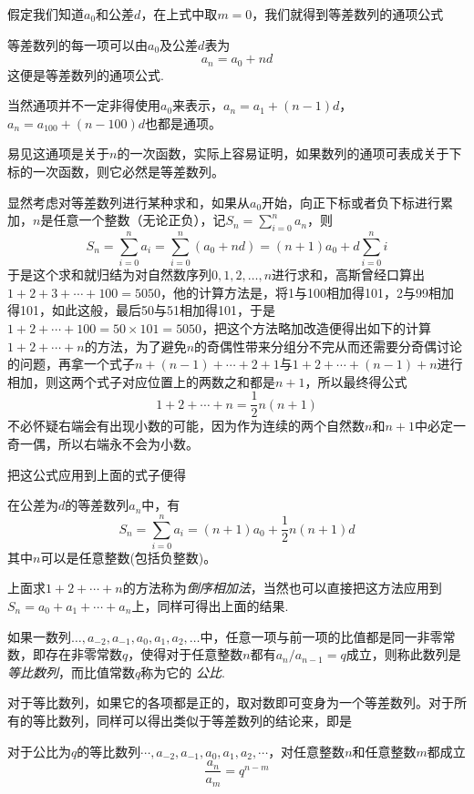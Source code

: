 假定我们知道$a_0$和公差$d$，在上式中取$m=0$，我们就得到等差数列的通项公式
\begin{theorem}
  等差数列的每一项可以由$a_0$及公差$d$表为
\[ a_n=a_0+nd \]
这便是等差数列的通项公式.
\end{theorem}

当然通项并不一定非得使用$a_0$来表示，$a_n=a_1+(n-1)d$，$a_n=a_{100}+(n-100)d$也都是通项。

易见这通项是关于$n$的一次函数，实际上容易证明，如果数列的通项可表成关于下标的一次函数，则它必然是等差数列。

显然考虑对等差数列进行某种求和，如果从$a_0$开始，向正下标或者负下标进行累加，$n$是任意一个整数（无论正负），记$S_n=\sum_{i=0}^{n}a_n$，则
\[ S_n=\sum_{i=0}^na_i=\sum_{i=0}^n(a_0+nd)=(n+1)a_0+d\sum_{i=0}^ni\]
于是这个求和就归结为对自然数序列$0,1,2,\ldots,n$进行求和，高斯曾经口算出$1+2+3+\cdots+100=5050$，他的计算方法是，将1与100相加得101，2与99相加得101，如此这般，最后50与51相加得101，于是$1+2+\cdots+100=50 \times 101=5050$，把这个方法略加改造便得出如下的计算$1+2+\cdots+n$的方法，为了避免$n$的奇偶性带来分组分不完从而还需要分奇偶讨论的问题，再拿一个式子$n+(n-1)+\cdots+2+1$与$1+2+\cdots+(n-1)+n$进行相加，则这两个式子对应位置上的两数之和都是$n+1$，所以最终得公式
\[ 1+2+\cdots+n = \frac{1}{2}n(n+1) \]
不必怀疑右端会有出现小数的可能，因为作为连续的两个自然数$n$和$n+1$中必定一奇一偶，所以右端永不会为小数。

把这公式应用到上面的式子便得
\begin{theorem}
  在公差为$d$的等差数列$a_n$中，有
  \[ S_n=\sum_{i=0}^na_i=(n+1)a_0+\frac{1}{2}n(n+1)d \]
  其中$n$可以是任意整数(包括负整数)。
\end{theorem}

上面求$1+2+\cdots+n$的方法称为\emph{倒序相加法}，当然也可以直接把这方法应用到$S_n=a_0+a_1+\cdots+a_n$上，同样可得出上面的结果.

\begin{definition}
  如果一数列$\ldots,a_{-2},a_{-1},a_0,a_1,a_2,\ldots$中，任意一项与前一项的比值都是同一非零常数，即存在非零常数$q$，使得对于任意整数$n$都有$a_n / a_{n-1} = q$成立，则称此数列是 \emph{等比数列}，而比值常数$q$称为它的 \emph{公比}.
\end{definition}

对于等比数列，如果它的各项都是正的，取对数即可变身为一个等差数列。对于所有的等比数列，同样可以得出类似于等差数列的结论来，即是

\begin{theorem}
对于公比为$q$的等比数列$\cdots,a_{-2},a_{-1},a_0,a_1,a_2,\cdots$，对任意整数$n$和任意整数$m$都成立
\[ \frac{a_n}{a_m}=q^{n-m} \]
\end{theorem}

